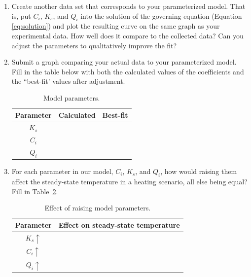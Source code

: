\documentclass[11pt]{article} %
\begin{document}
\begin{enumerate}
\item Create another data set that corresponds to your parameterized model. That is, put $C_{i}$, $K_s$, and $Q_{i}$ into the solution of the governing equation (Equation \ref{eq:solution}) and plot the resulting curve on the same graph as your experimental data. How well does it compare to the collected data? Can you adjust the parameters to qualitatively improve the fit?%
\item Submit a graph comparing your actual data to your parameterized model. Fill in the table below with both the calculated values of the coefficients and the “best-fit’ values after adjustment.

\begin{table}[htp]
\begin{center}
\begin{tabular}{c|c|c}
Parameter & Calculated & Best-fit\\
\hline
$K_s$ & & \\
$C_{i} $ & & \\
$Q_{i} $ & & \\
\end{tabular}
\end{center}
\caption{Model parameters.}
\label{default}
\end{table}%

\item For each parameter in our model, $C_i$, $K_s$, and $Q_i$, how would raising them affect the steady-state temperature in a heating scenario, all else being equal? Fill in Table~\ref{tab:parameter.changes}.
\begin{table}[htp]
\begin{center}
\begin{tabular}{c|c}
Parameter & Effect on steady-state temperature\\
\hline
$K_s\uparrow$ & \\
$C_{i}\uparrow$ & \\
$Q_{i}\uparrow$ & \\
\end{tabular}
\end{center}
\caption{Effect of raising model parameters.}
\label{tab:parameter.changes}
\end{table}%


\end{enumerate}
\end{document}
